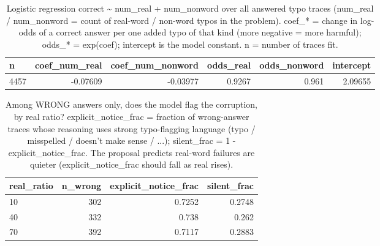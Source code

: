 \documentclass[11pt]{article}
\begin{document}
\begin{table}[H]
\centering
\caption{Logistic regression correct \textasciitilde{} num\_real + num\_nonword over all answered typo traces (num\_real / num\_nonword = count of real-word / non-word typos in the problem). coef\_* = change in log-odds of a correct answer per one added typo of that kind (more negative = more harmful); odds\_* = exp(coef); intercept is the model constant. n = number of traces fit.}
\small
\begin{adjustbox}{max width=\textwidth}
\begin{tabular}{lrrrrr}
\toprule
\textbf{n} & \textbf{coef\_num\_real} & \textbf{coef\_num\_nonword} & \textbf{odds\_real} & \textbf{odds\_nonword} & \textbf{intercept} \\
\midrule
4457 & -0.07609 & -0.03977 & 0.9267 & 0.961 & 2.09655 \\
\bottomrule
\end{tabular}
\end{adjustbox}
\end{table}

\begin{table}[H]
\centering
\caption{Among WRONG answers only, does the model flag the corruption, by real ratio? explicit\_notice\_frac = fraction of wrong-answer traces whose reasoning uses strong typo-flagging language (typo / misspelled / doesn't make sense / ...); silent\_frac = 1 - explicit\_notice\_frac. The proposal predicts real-word failures are quieter (explicit\_notice\_frac should fall as real rises).}
\small
\begin{adjustbox}{max width=\textwidth}
\begin{tabular}{lrrr}
\toprule
\textbf{real\_ratio} & \textbf{n\_wrong} & \textbf{explicit\_notice\_frac} & \textbf{silent\_frac} \\
\midrule
10 & 302 & 0.7252 & 0.2748 \\
40 & 332 & 0.738 & 0.262 \\
70 & 392 & 0.7117 & 0.2883 \\
\bottomrule
\end{tabular}
\end{adjustbox}
\end{table}
\end{document}

